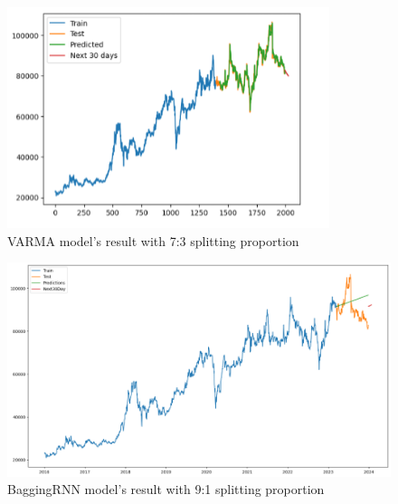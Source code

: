 \documentclass{ieeeojies}
\begin{document}
\begin{figure}[H]
  \centering
  \begin{minipage}{0.8\linewidth}
    \centering
    \includegraphics[width=\linewidth]{bibliography/GRU_VCB73.png}
    \caption{VARMA model's result with 7:3 splitting proportion}
    \label{fig10}
  \end{minipage}
\end{figure}
\begin{figure}[H]
  \centering
  \begin{minipage}{0.8\linewidth}
    \centering
    \includegraphics[width=\linewidth]{bibliography/ARIMA_VCB91.png}
    \caption{BaggingRNN model's result with 9:1 splitting proportion}
    \label{fig11}
  \end{minipage}
\end{figure}
\end{document}
